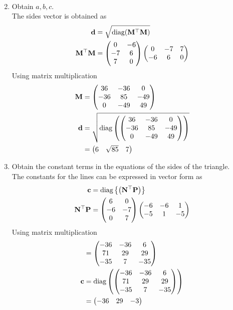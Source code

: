 \documentclass[11pt]{book}
\begin{document}
\begin{enumerate}[label=\thesubsection.\arabic*.,ref=\thesubsection.\theenumi]
\begin{align}
\end{align}
\item Obtain $a, b, c$. \\
\solution The sides vector is obtained as
\begin{align}
\mathbf{d} &= \sqrt{\text{diag}(\mathbf{M}^{\top}\mathbf{M})}\\
\mathbf{M}^{\top}\mathbf{M} &= \begin{pmatrix}0&-6\\ -7 &6 \\ 7 &0\end{pmatrix}\begin{pmatrix}0 & -7 & 7 \\ -6 & 6 & 0\end{pmatrix}
\end{align} 
Using matrix multiplication 
\begin{align}
    \mathbf{M} &= \begin{pmatrix} 36 & -36 & 0 \\ -36 & 85 & -49 \\ 0 & -49 & 49\end{pmatrix} \\
    \mathbf{d} &= \sqrt{\text{diag}\left(\begin{pmatrix} 36 & -36 & 0 \\ -36 & 85 & -49 \\ 0 & -49 & 49\end{pmatrix}\right)} \\
    &= \begin{pmatrix} 6 & \sqrt{85} & 7\end{pmatrix}
\end{align}

\item Obtain the constant terms in the equations of the sides of the triangle. \\
\solution The constants for the lines can be expressed in vector form as
\begin{align}
\mathbf{c} &= \text{diag}\left\{\left(\mathbf{N}^{\top}\mathbf{P}\right)\right\}  \\
\mathbf{N}^{\top}\mathbf{P} &= \begin{pmatrix}6&0 \\ -6&-7 \\ 0 &7\end{pmatrix}\begin{pmatrix}-6 & -6 & 1 \\ -5 & 1 & -5\end{pmatrix} \\
\end{align}
Using matrix multiplication
\begin{align}
    &=\begin{pmatrix} -36 & -36 & 6 \\ 71 & 29 & 29 \\ -35 & 7 & -35 \end{pmatrix} \\
    \mathbf{c} &= \text{diag}\left( \begin{pmatrix} -36 & -36 & 6 \\ 71 & 29 & 29 \\ -35 & 7 & -35 \end{pmatrix}\right) \\
    &= \begin{pmatrix} -36 & 29 & -3\end{pmatrix}
\end{align}
\end{enumerate}
\end{document}
